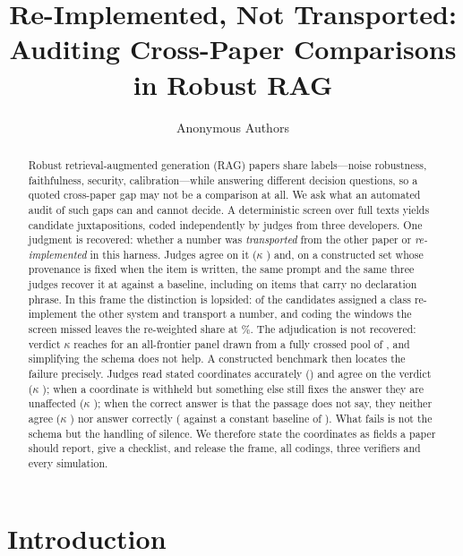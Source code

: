 \documentclass[11pt]{article}
\title{Re-Implemented, Not Transported:\\
Auditing Cross-Paper Comparisons in Robust RAG}
\author{Anonymous Authors}
\date{}
\begin{document}
\maketitle

\begin{abstract}
Robust retrieval-augmented generation (RAG) papers share labels---noise
robustness, faithfulness, security, calibration---while answering different
decision questions, so a quoted cross-paper gap may not be a comparison at all.
We ask what an automated audit of such gaps can and cannot decide. A
deterministic screen over \FrameScreened{} full texts yields \FrameCandidates{}
candidate juxtapositions, coded independently by judges from three developers.
One judgment is recovered: whether a number was \emph{transported} from the
other paper or \emph{re-implemented} in this harness. Judges agree on it
($\kappa$ \DecProvK{}) and, on a constructed set whose provenance is fixed when
the item is written, the same prompt and the same three judges recover it at
\PvAcc{} against a \PvBase{} baseline, including on items that carry no
declaration phrase. In this frame the distinction is lopsided:
\ProvReimplemented{} of the \ProvClassified{} candidates assigned a class
re-implement the other system and \ProvTransported{} transport a number, and
coding the windows the screen missed leaves the re-weighted share at
\RecUniverseShare\%. The adjudication is not recovered: verdict $\kappa$ reaches
\TierFrontierVerdictK{} for an all-frontier panel drawn from a fully crossed
pool of \TierPanelN{}, and simplifying the schema does not help. A constructed
benchmark then locates the failure precisely. Judges read stated coordinates
accurately (\InsFullCoord{}) and agree on the verdict ($\kappa$ \InsFullK{});
when a coordinate is withheld but something else still fixes the answer they are
unaffected ($\kappa$ \InsBalK{}); when the correct answer is that the passage
does not say, they neither agree ($\kappa$ \InsForceK{}) nor answer correctly
(\InsForceJudge{} against a constant baseline of \InsForceBase{}). What fails is
not the schema but the handling of silence. We therefore state the coordinates
as fields a paper should report, give a checklist, and release the frame, all
codings, three verifiers and every simulation.
\end{abstract}

\section{Introduction}
\label{sec:introduction}
\end{document}
